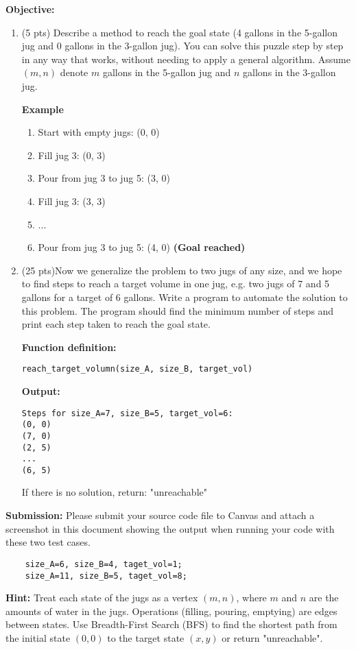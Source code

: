 \documentclass[12pt]{article}
\begin{document}
\noindent \textbf{Objective:}  
\begin{enumerate}
    \item (5 pts) Describe a method to reach the goal state (4 gallons in the 5-gallon jug and 0 gallons in the 3-gallon jug). You can solve this puzzle step by step in any way that works, without needing to apply a general algorithm. Assume $(m,n)$ denote $m$ gallons in the 5-gallon jug and $n$ gallons in the 3-gallon jug.
    
\noindent \textbf{Example}
\begin{enumerate}
    \item Start with empty jugs: (0, 0)
    \item Fill jug 3: (0, 3)
    \item Pour from jug 3 to jug 5: (3, 0)
    \item Fill jug 3: (3, 3)
    \item ...
    \item Pour from jug 3 to jug 5: (4, 0)  \textbf{(Goal reached)}
\end{enumerate}


    \item (25 pts)Now we generalize the problem to two jugs of any size, and we hope to find steps to reach a target volume in one jug, e.g. two jugs of 7 and 5 gallons for a target of 6 gallons. Write a program to automate the solution to this problem. The program should find the minimum number of steps and print each step taken to reach the goal state.

\noindent \textbf{Function definition:}
\begin{verbatim}
reach_target_volumn(size_A, size_B, target_vol)
\end{verbatim}

\noindent \textbf{Output:}
\begin{verbatim}
Steps for size_A=7, size_B=5, target_vol=6: 
(0, 0)
(7, 0)
(2, 5)
...
(6, 5)    
\end{verbatim}

\noindent If there is no solution, return: "unreachable"
\end{enumerate}

\noindent \textbf{Submission:}  
Please submit your source code file to Canvas and attach a screenshot in this document showing the output when running your code with these two test cases.\\
\begin{verbatim}
    size_A=6, size_B=4, taget_vol=1;
    size_A=11, size_B=5, taget_vol=8;    
\end{verbatim}

\noindent \textbf{Hint:} 
Treat each state of the jugs as a vertex \((m, n)\), where \(m\) and \(n\) are the amounts of water in the jugs. Operations (filling, pouring, emptying) are edges between states. Use Breadth-First Search (BFS) to find the shortest path from the initial state \((0, 0)\) to the target state \((x, y)\) or return "unreachable".
\end{document}
